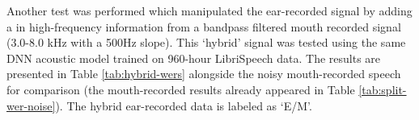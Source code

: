 % 
% 


Another test was performed which manipulated the ear-recorded signal by adding a in high-frequency information from a bandpass filtered mouth recorded signal (3.0-8.0 kHz with a 500Hz slope).  This `hybrid' signal was tested using the same DNN acoustic model trained on 960-hour LibriSpeech data.  The results are presented in Table \ref{tab:hybrid-wers} alongside the noisy mouth-recorded speech for comparison (the mouth-recorded results already appeared in Table \ref{tab:split-wer-noise}).  The hybrid ear-recorded data is labeled as `E/M'.

